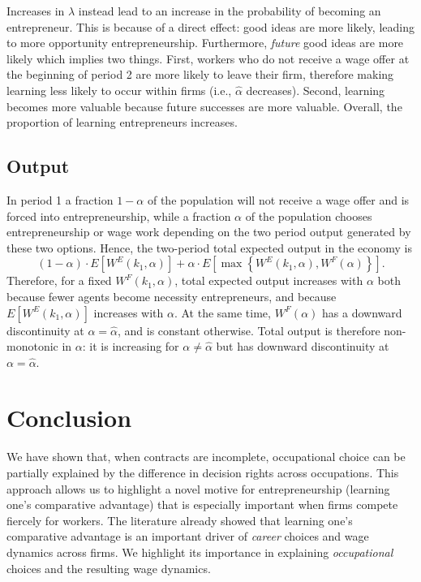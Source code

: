 \documentclass[12pt,american]{paper}
\theoremstyle{remark}
\begin{document}
Increases in $\lambda$ instead lead to an increase in the probability of becoming an entrepreneur. This is because of a direct effect: good ideas are more likely, leading to more opportunity entrepreneurship. Furthermore, \textit{future} good ideas are more likely which implies two things. First, workers who do not receive a wage offer at the beginning of period 2 are more likely to leave their firm, therefore making learning less likely to occur within firms (i.e., $\hat \alpha$ decreases). Second, learning becomes more valuable because future successes are more valuable. Overall, the proportion of learning entrepreneurs increases. 



\subsection{Output}
In period 1 a fraction $1-\alpha$ of the population will not receive a wage offer and is forced into entrepreneurship, while a fraction $\alpha$ of the population chooses entrepreneurship or wage work depending on the two period output generated by these two options. Hence, the two-period total expected output in the economy is
\[
(1-\alpha) \cdot E[W^E(k_1,\alpha)] + \alpha \cdot E[ \max\left\lbrace W^E(k_1,\alpha), W^F(\alpha) \right\rbrace ].
\]
Therefore, for a fixed $W^F(k_1,\alpha)$, total expected output increases with $\alpha$ both because fewer agents become necessity entrepreneurs, and because $E[W^E(k_1,\alpha)]$ increases with $\alpha$. At the same time, $W^F(\alpha)$ has a downward discontinuity at $\alpha=\hat \alpha$, and is constant otherwise.  Total output is therefore non-monotonic in $\alpha$: it is increasing for $\alpha \neq \hat \alpha$ but has downward discontinuity at $\alpha=\hat \alpha$.




\section{Conclusion}\label{conclusion}
%
We have shown that, when contracts are incomplete, occupational choice can be partially explained by the difference in decision rights across occupations. This approach allows us to highlight a novel motive for entrepreneurship (learning one's comparative advantage) that is especially important when firms compete fiercely for workers. The literature already showed  that learning one's comparative advantage is an important driver of \textit{career} choices and wage dynamics across firms. We highlight its importance in explaining \textit{occupational} choices and the resulting wage dynamics.
\end{document}
